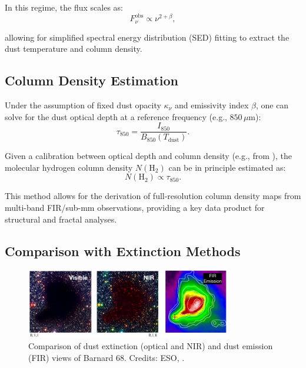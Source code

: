 In this regime, the flux scales as:
\begin{equation}
    F_\nu^{\mathrm{obs}} \propto \nu^{2+\beta},
\end{equation}

allowing for simplified spectral energy distribution (SED) fitting to extract the dust temperature and column density.

\subsection{Column Density Estimation}

Under the assumption of fixed dust opacity $\kappa_{\nu}$ and emissivity index $\beta$, one can solve for the dust optical depth at a reference frequency (e.g., $850\,\mu$m):
\begin{equation}
    \tau_{850} = \frac{I_{850}}{B_{850}(T_\mathrm{dust})}.
\end{equation}

Given a calibration between optical depth and column density (e.g., from \cite{hildebrand1983determination}), the molecular hydrogen column density $N(\mathrm{H}_2)$ can be in principle estimated as:
\begin{equation}
    N(\mathrm{H}_2) \propto \tau_{850}.
\end{equation}

This method allows for the derivation of full-resolution column density maps from multi-band FIR/sub-mm observations, providing a key data product for structural and fractal analyses.

\subsection{Comparison with Extinction Methods}

\begin{figure}[t]
    \centering
    \includegraphics[width=0.8\textwidth]{figures/comparison_dust.png}
    \caption{Comparison of dust extinction (optical and NIR) and dust emission (FIR) views of Barnard 68. Credits: ESO, \cite{nielbock2012earliest}.}
    \label{fig:comparison_dust}
\end{figure}

